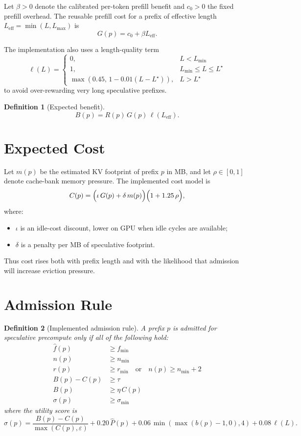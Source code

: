 \documentclass[11pt]{article}
\newtheorem{definition}{Definition}
\begin{document}
Let $\beta > 0$ denote the calibrated per-token prefill benefit and $c_0 > 0$ the
fixed prefill overhead. The reusable prefill cost for a prefix of effective length
$L_{\mathrm{eff}} = \min(L, L_{\max})$ is
\[
    G(p) = c_0 + \beta L_{\mathrm{eff}}.
\]

The implementation also uses a length-quality term
\[
    \ell(L) =
    \begin{cases}
        0, & L < L_{\min} \\
        1, & L_{\min} \le L \le L^\star \\
        \max(0.45,\, 1 - 0.01(L - L^\star)), & L > L^\star
    \end{cases}
\]
to avoid over-rewarding very long speculative prefixes.

\begin{definition}[Expected benefit]
\[
    B(p) = R(p)\, G(p)\, \ell(L_{\mathrm{eff}}).
\]
\end{definition}

\section{Expected Cost}

Let $m(p)$ be the estimated KV footprint of prefix $p$ in MB, and let
$\rho \in [0,1]$ denote cache-bank memory pressure. The implemented cost model is
\[
    C(p) =
    \Bigl(\iota \, G(p) + \delta\, m(p)\Bigr)\Bigl(1 + 1.25\,\rho\Bigr),
\]
where:
\begin{itemize}
    \item $\iota$ is an idle-cost discount, lower on GPU when idle cycles are available;
    \item $\delta$ is a penalty per MB of speculative footprint.
\end{itemize}

Thus cost rises both with prefix length and with the likelihood that admission will
increase eviction pressure.

\section{Admission Rule}

\begin{definition}[Implemented admission rule]
A prefix $p$ is admitted for speculative precompute only if all of the following hold:
\begin{align}
    \hat{f}(p) &\ge f_{\min} \tag{A1: frequency gate} \\
    n(p) &\ge n_{\min} \tag{A2: observation gate} \\
    r(p) &\ge r_{\min} \quad \text{or} \quad n(p) \ge n_{\min}+2 \tag{A3: recent-support gate} \\
    B(p) - C(p) &\ge \tau \tag{A4: net-gain floor} \\
    B(p) &\ge \eta\, C(p) \tag{A5: benefit-cost ratio} \\
    \sigma(p) &\ge \sigma_{\min} \tag{A6: utility-score floor}
\end{align}
where the utility score is
\[
    \sigma(p) =
    \frac{B(p)-C(p)}{\max(C(p), \varepsilon)}
    + 0.20\,\hat{P}(p)
    + 0.06\,\min(\max(b(p)-1,0),4)
    + 0.08\,\ell(L).
\]
\end{definition}
\end{document}
